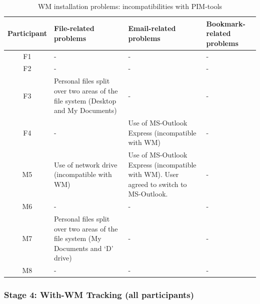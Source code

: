 \begin{table}[hbtp]
\begin{center}
\begin{footnotesize}
\setlength{\extrarowheight}{2pt}
\begin{tabular}{|c|p{4cm}|p{5cm}|p{2.4cm}|}
\hline
  {\bf Participant} & {\bf File-related problems} & {\bf Email-related problems} & {\bf Bookmark-related problems} \\
\hline
        F1 &          - &          - &          - \\
\hline
        F2 &          - &          - &          - \\
\hline
        F3 & Personal files split over two areas of the file system (Desktop and My Documents) &          - &          - \\
\hline
        F4 &          - & Use of MS-Outlook Express (incompatible with WM) &          - \\
\hline
        M5 & Use of  network drive (incompatible with WM) & Use of MS-Outlook Express (incompatible with WM). User agreed to switch to MS-Outlook. &          - \\
\hline
        M6 &          - &          - &          - \\
\hline
        M7 & Personal files split over two areas of the file system (My Documents and `D' drive) &          - &          - \\
\hline
        M8 &          - &          - &          - \\
\hline
\end{tabular}  
\end{footnotesize}
\caption{WM installation problems: incompatibilities with PIM-tools}
\label{table:main-study:participants-problems}
\end{center}
\end{table}
\normalsize








\subsubsection{Stage 4: With-WM Tracking (all participants)}

